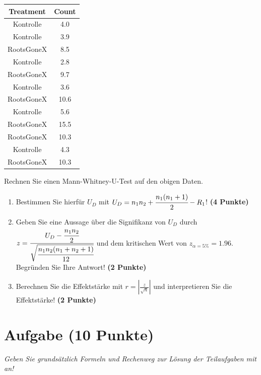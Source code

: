 \documentclass[a4paper, 9pt]{scrartcl}\usepackage[]{graphicx}\usepackage[]{xcolor}
\newenvironment{knitrout}{}{} %
\begin{document}
\begin{knitrout}
\color{fgcolor}\begin{table}[!h]
\centering
\begin{tabular}{cc}
\toprule
Treatment & Count\\
\midrule
Kontrolle & 4.0\\
Kontrolle & 3.9\\
RootsGoneX & 8.5\\
Kontrolle & 2.8\\
RootsGoneX & 9.7\\
\addlinespace
Kontrolle & 3.6\\
RootsGoneX & 10.6\\
Kontrolle & 5.6\\
RootsGoneX & 15.5\\
RootsGoneX & 10.3\\
\addlinespace
Kontrolle & 4.3\\
RootsGoneX & 10.3\\
\bottomrule
\end{tabular}
\end{table}

\end{knitrout}

Rechnen Sie einen Mann-Whitney-U-Test auf den obigen Daten.

\begin{enumerate}
\item Bestimmen Sie hierf{\"u}r $U_D$ mit $U_D = n_1n_2 +
  \cfrac{n_1(n_1+1)}{2}-R_1$! \textbf{(4 Punkte)} 
\item Geben Sie eine Aussage {\"u}ber die Signifikanz von $U_D$ durch
  $z = \cfrac{U_D -
    \cfrac{n_1n_2}{2}}{\sqrt{\cfrac{n_1n_2(n_1+n_2+1)}{12}}}$ und dem
  kritischen Wert von $z_{\alpha = 5\%} = 1.96$. Begr{\"u}nden Sie Ihre
  Antwort! \textbf{(2 Punkte)}
\item Berechnen Sie die Effektst{\"a}rke mit $r = |\frac{z}{\sqrt{n}}| $ und
  interpretieren Sie die Effektst{\"a}rke! \textbf{(2 Punkte)} 
\end{enumerate} 
\clearpage

\section{Aufgabe \hfill (10 Punkte)}

\textit{Geben Sie grunds{\"a}tzlich Formeln und Rechenweg zur L{\"o}sung der
  Teilaufgaben mit an!} \\[1Ex]
\end{document}
